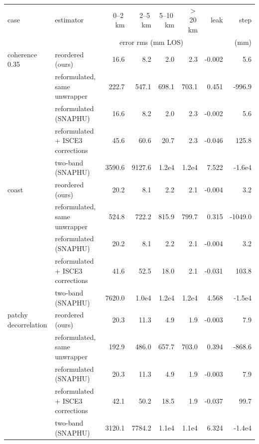 \begin{tabular}{llrrrrrr}
\toprule
case & estimator & 0--2\,km & 2--5\,km & 5--10\,km & $>$20\,km & leak & step \\
 & & \multicolumn{4}{c}{error rms (mm LOS)} & & (mm) \\
\midrule
coherence 0.35 & reordered (ours) & 16.6 & 8.2 & 2.0 & 2.3 & -0.002 & 5.6 \\
 & reformulated, same unwrapper & 222.7 & 547.1 & 698.1 & 703.1 & 0.451 & -996.9 \\
 & reformulated (SNAPHU) & 16.6 & 8.2 & 2.0 & 2.3 & -0.002 & 5.6 \\
 & reformulated + ISCE3 corrections & 45.6 & 60.6 & 20.7 & 2.3 & -0.046 & 125.8 \\
 & two-band (SNAPHU) & 3590.6 & 9127.6 & 1.2e4 & 1.2e4 & 7.522 & -1.6e4 \\
\midrule
coast & reordered (ours) & 20.2 & 8.1 & 2.2 & 2.1 & -0.004 & 3.2 \\
 & reformulated, same unwrapper & 524.8 & 722.2 & 815.9 & 799.7 & 0.315 & -1049.0 \\
 & reformulated (SNAPHU) & 20.2 & 8.1 & 2.2 & 2.1 & -0.004 & 3.2 \\
 & reformulated + ISCE3 corrections & 41.6 & 52.5 & 18.0 & 2.1 & -0.031 & 103.8 \\
 & two-band (SNAPHU) & 7620.0 & 1.0e4 & 1.2e4 & 1.2e4 & 4.568 & -1.5e4 \\
\midrule
patchy decorrelation & reordered (ours) & 20.3 & 11.3 & 4.9 & 1.9 & -0.003 & 7.9 \\
 & reformulated, same unwrapper & 192.9 & 486.0 & 657.7 & 703.0 & 0.394 & -868.6 \\
 & reformulated (SNAPHU) & 20.3 & 11.3 & 4.9 & 1.9 & -0.003 & 7.9 \\
 & reformulated + ISCE3 corrections & 42.1 & 50.2 & 18.5 & 1.9 & -0.037 & 99.7 \\
 & two-band (SNAPHU) & 3120.1 & 7784.2 & 1.1e4 & 1.1e4 & 6.324 & -1.4e4 \\
\bottomrule
\end{tabular}
